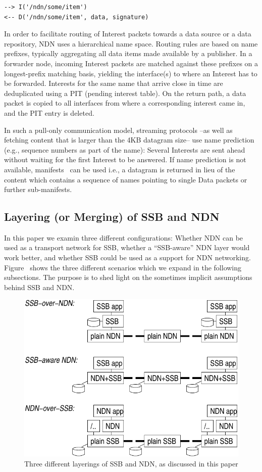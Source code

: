 \documentclass[sigconf]{acmart}
\begin{document}
\begin{verbatim}
--> I('/ndn/some/item')
<-- D('/ndn/some/item', data, signature)
\end{verbatim}

In order to facilitate routing of Interest packets towards a data
source or a data repository, NDN uses a hierarchical name
space. Routing rules are based on name prefixes, typically aggregating
all data items made available by a publisher. In a forwarder node,
incoming Interest packets are matched against these prefixes on a
longest-prefix matching basis, yielding the interface(s) to where an
Interest has to be forwarded. Interests for the same name that arrive
close in time are deduplicated using a PIT (pending interest
table). On the return path, a data packet is copied to all interfaces
from where a corresponding interest came in, and the PIT entry is
deleted.

In such a pull-only communication model, streaming protocols --as well
as fetching content that is larger than the 4KB datagram size-- use
name prediction (e.g., sequence numbers as part of the name): Several
Interests are sent ahead without waiting for the first Interest to be
answered. If name prediction is not available,
manifests~\cite{manifest} can be used i.e., a datagram is returned in
lieu of the content which contains a sequence of names pointing to
single Data packets or further sub-manifests.

\subsection{Layering (or Merging) of SSB and NDN}

In this paper we examin three different configurations: Whether NDN
can be used as a transport network for SSB, whether a ``SSB-aware''
NDN layer would work better, and whether SSB could be used as a
support for NDN networking. Figure~\cite{fig:ssb-and-ndn} shows the
three different scenarios which we expand in the following
subsections. The purpose is to shed light on the sometimes implicit
assumptions behind SSB and NDN.

\begin{figure}[htb]
  \raggedright
  \includegraphics[width=0.9\columnwidth]{figs/ssb-and-ndn.pdf}
  \caption{\label{fig:ssb-and-ndn}Three different layerings of SSB and NDN,
    as discussed in this paper}
\end{figure}
\end{document}

